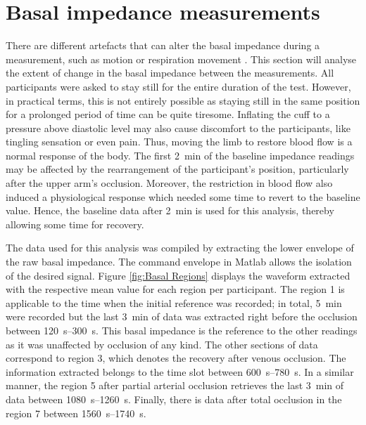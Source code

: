 \section{Basal impedance measurements}
\label{senction basal 3}
There are different artefacts that can alter the basal impedance during a measurement, such as motion or respiration movement \cite{pandey2006cancellation, swanson1983errors, ansari2010impedance, rosell1995reduction}. This section will analyse the extent of change in the basal impedance between the measurements. All participants were asked to stay still for the entire duration of the test. However, in practical terms, this is not entirely possible as staying still in the same position for a prolonged period of time can be quite tiresome. Inflating the cuff to a pressure above diastolic level may also cause discomfort to the participants, like tingling sensation or even pain. Thus, moving the limb to restore blood flow is a normal response of the body. The first \SI{2}{\minute} of the baseline impedance readings may be affected by the rearrangement of the participant's position, particularly after the upper arm's occlusion. Moreover, the restriction in blood flow also induced a physiological response which needed some time to revert to the baseline value. Hence, the baseline data after \SI{2}{\minute} is used for this analysis, thereby allowing some time for recovery. 

The data used for this analysis was compiled by extracting the lower envelope of the raw basal impedance. The command envelope in Matlab \cite{MATLAB:2016} allows the isolation of the desired signal. Figure \ref{fig:Basal Regions} displays the waveform extracted with the respective mean value for each region per participant. The region 1 is applicable to the time when the initial reference was recorded; in total, \SI{5}{\minute} were recorded but the last \SI{3}{\minute} of data was extracted right before the occlusion between \SIrange{120}{300}{\second}. This basal impedance is the reference to the other readings as it was unaffected by occlusion of any kind. The other sections of data correspond to region 3, which denotes the recovery after venous occlusion. The information extracted belongs to the time slot between \SIrange{ 600}{780}{\second}.  In a similar manner, the region 5 after partial arterial occlusion retrieves the last \SI{3}{\minute} of data between \SIrange{1080}{1260}{\second}. Finally, there is data after total occlusion in the region 7 between \SIrange{1560}{1740}{\second}.

